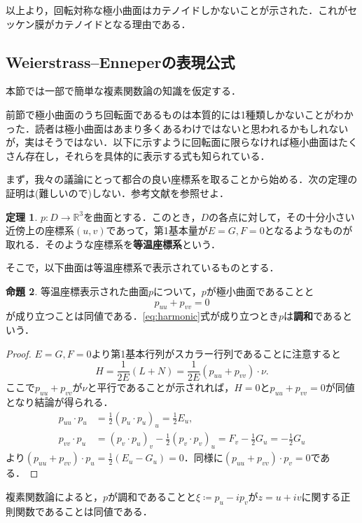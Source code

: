 \documentclass[a4j]{ltjsarticle}
\newcommand{\Rset}{\mathbb{R}}
\numberwithin{equation}{section}
\theoremstyle{definition}
\newtheorem{thm}{定理}[section]
\newtheorem{prop}[thm]{命題}
\begin{document}
以上より，回転対称な極小曲面はカテノイドしかないことが示された．これがセッケン膜がカテノイドとなる理由である．
\subsection{Weierstrass--Enneperの表現公式}
本節では一部で簡単な複素関数論の知識を仮定する．

前節で極小曲面のうち回転面であるものは本質的には1種類しかないことがわかった．読者は極小曲面はあまり多くあるわけではないと思われるかもしれないが，実はそうではない．以下に示すように回転面に限らなければ極小曲面はたくさん存在し，それらを具体的に表示する式も知られている．

まず，我々の議論にとって都合の良い座標系を取ることから始める．次の定理の証明は(難しいので)しない．参考文献\cite[定理15.4]{山田}を参照せよ．
\begin{thm}
    $p:D\to \Rset^3$を曲面とする．このとき，$D$の各点に対して，その十分小さい近傍上の座標系$(u,v)$であって，第1基本量が$E=G,F=0$となるようなものが取れる．そのような座標系を\textbf{等温座標系}という．
\end{thm}
そこで，以下曲面は等温座標系で表示されているものとする．
\begin{prop}
    等温座標表示された曲面$p$について，$p$が極小曲面であることと
    \begin{equation}
        p_{uu}+p_{vv}=0\label{eq:harmonic}
    \end{equation}
    が成り立つことは同値である．\eqref{eq:harmonic}式が成り立つとき$p$は\textbf{調和}であるという．
\end{prop}
\begin{proof}
    $E=G,F=0$より第1基本行列がスカラー行列であることに注意すると
    \begin{equation}
        H=\frac{1}{2E}(L+N)=\frac{1}{2E}(p_{uu}+p_{vv})\cdot \nu .
    \end{equation}
    ここで$p_{uu}+p_{vv}$が$\nu$と平行であることが示されれば，$H=0$と$p_{uu}+p_{vv}=0$が同値となり結論が得られる．
    \begin{align}
        p_{uu}\cdot p_{u}&=\frac{1}{2}(p_u\cdot p_u)_u=\frac{1}{2}E_u,\\
        p_{vv}\cdot p_{u}&=(p_{v}\cdot p_u)_v-\frac{1}{2}(p_v\cdot p_v)_u=F_v-\frac{1}{2}G_u=-\frac{1}{2}G_{u}
    \end{align}
    より$(p_{uu}+p_{vv})\cdot p_u=\frac{1}{2}(E_u-G_u)=0$．同様に$(p_{uu}+p_{vv})\cdot p_v=0$である．
\end{proof}
複素関数論によると，$p$が調和であることと$\xi\coloneq p_u-ip_v$が$z=u+iv$に関する正則関数であることは同値である．
\end{document}

